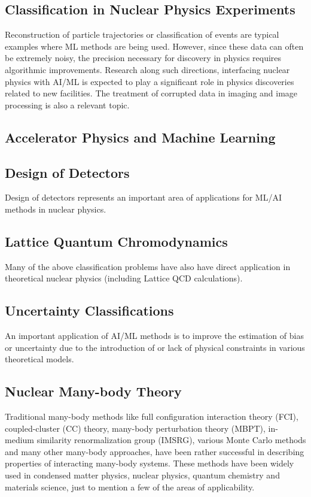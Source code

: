 \documentclass[%
oneside,                 %
final,                   %
10pt]{article}
\begin{document}
\subsection{Classification in Nuclear Physics Experiments}
Reconstruction of particle trajectories or classification of events are typical examples where ML methods are being used. However, since these data can often be extremely noisy, the precision necessary for discovery in physics requires algorithmic improvements. Research along such directions, interfacing nuclear physics with AI/ML is expected to play a significant role in physics discoveries related to new facilities.  The treatment of corrupted data in imaging and image processing is also a relevant topic. 

\subsection{Accelerator Physics and Machine Learning}

\subsection{Design of Detectors}
Design of detectors represents an important area of applications for ML/AI methods in nuclear physics.

\subsection{Lattice Quantum Chromodynamics}
Many of the above classification problems have also have direct application in theoretical nuclear physics (including Lattice QCD calculations).

\subsection{Uncertainty Classifications}
An important application of AI/ML methods is to improve the estimation of bias or uncertainty due to the introduction of or lack of physical constraints in various theoretical models.

\subsection{Nuclear Many-body Theory}

Traditional many-body methods like full configuration interaction
theory (FCI), coupled-cluster (CC) theory, many-body perturbation theory (MBPT),
in-medium similarity renormalization group (IMSRG),
various Monte Carlo methods and many other many-body
approaches, have been rather successful in describing properties of
interacting many-body systems. These methods have been widely used in
condensed matter physics, nuclear physics, quantum chemistry and
materials science, just to mention a few of the areas of
applicability.
\end{document}
